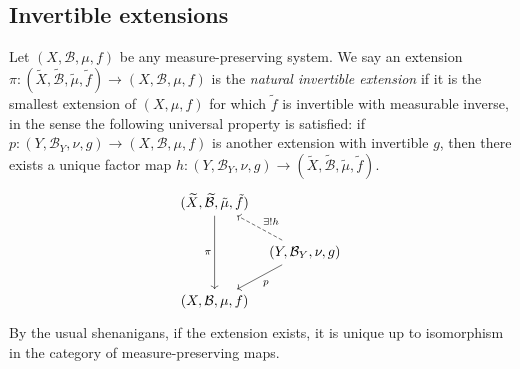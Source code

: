 \documentclass[../main]{subfiles}
\begin{document}



\subsection{Invertible extensions}\label{sec:invert-extens}

\begin{definition}
  Let \((X, \mathcal{B}, \mu, f)\) be any measure-preserving system. We say an extension \(\pi \colon (\widetilde{X}, \widetilde{\mathcal{B}},\tilde{\mu}, \tilde{f}) \to (X,\mathcal{B}, \mu, f)\) is the \emph{natural invertible extension} if it is the smallest extension of \((X, \mu, f)\) for which \(\tilde{f}\) is invertible with measurable inverse, in the sense the following universal property is satisfied: if \(p \colon (Y,\mathcal{B}_Y,\nu,g) \to (X,\mathcal{B}, \mu, f)\) is another extension with invertible \(g\), then there exists a unique factor map \(h \colon (Y,\mathcal{B}_Y,\nu,g) \to (\widetilde{X}, \widetilde{\mathcal{B}},\tilde{\mu}, \tilde{f})\).
  \begin{equation}
    \begin{tikzcd}[column sep = tiny]
      {(\widetilde{X}, \widetilde{\mathcal{B}}, \tilde{\mu}, \tilde{f})} \\
      & {(Y,\mathcal{B}_Y,\nu,g)} \\
      {(X,\mathcal{B},\mu,f)}
      \arrow["\exists! h"', dashed, from=2-2, to=1-1]
      \arrow["\pi"', from=1-1, to=3-1]
      \arrow["p", from=2-2, to=3-1]
    \end{tikzcd}
  \end{equation}
  By the usual shenanigans, if the extension exists, it is unique up to isomorphism in the category of measure-preserving maps.
\end{definition}
\end{document}
